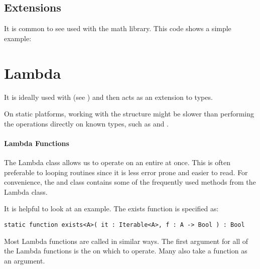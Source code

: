 
\subsection{Extensions}
\label{std-math-extensions}
It is common to see  used with the math library.  This code shows a simple example:  


\section{Lambda}
\label{std-Lambda}


It is ideally used with  (see ) and then acts as an extension to  types. 

On static platforms, working with the  structure might be slower than performing the operations directly on known types, such as  and .

\paragraph{Lambda Functions}
The Lambda class allows us to operate on an entire  at once.
This is often preferable to looping routines since it is less error prone and easier to read. 
For convenience, the  and  class contains some of the frequently used methods from the Lambda class.

It is helpful to look at an example. The exists function is specified as:

\begin{lstlisting}
static function exists<A>( it : Iterable<A>, f : A -> Bool ) : Bool
\end{lstlisting}

Most Lambda functions are called in similar ways. The first argument for all of the Lambda functions is the  on which to operate. Many also take a function as an argument.

